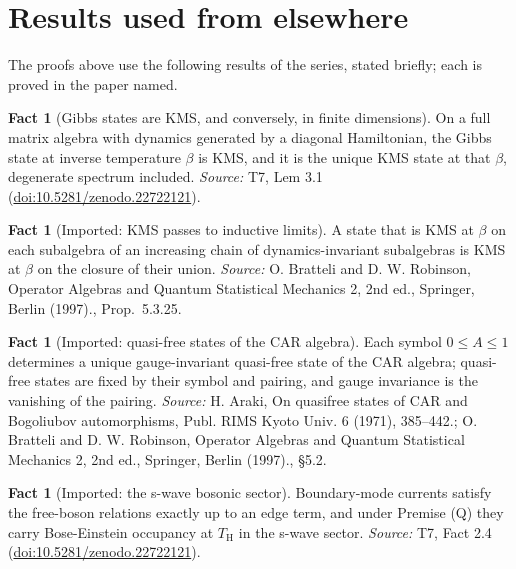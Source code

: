 \documentclass[11pt]{article}
\theoremstyle{definition}
\newtheorem{fact}[theorem]{Fact}
\theoremstyle{plain}
\providecommand{\TH}{}\renewcommand{\TH}{T_{\mathrm{H}}}
\begin{document}
\section{Results used from elsewhere}
The proofs above use the following results of the series, stated briefly; each is proved in the paper named.

\begin{fact}[Gibbs states are KMS, and conversely, in finite dimensions]\label{c:hawking.gibbs-states-are-kms-conversely-finite}
On a full matrix algebra with dynamics generated by a diagonal Hamiltonian, the Gibbs state at inverse temperature $\beta$ is KMS, and it is the unique KMS state at that $\beta$, degenerate spectrum included.
\emph{Source:} T7, Lem 3.1 (\href{https://doi.org/10.5281/zenodo.22722121}{doi:10.5281/zenodo.22722121}).
\end{fact}

\begin{fact}[Imported: KMS passes to inductive limits]\label{c:hawking.imported-kms-passes-inductive-limits}
A state that is KMS at $\beta$ on each subalgebra of an increasing chain of dynamics-invariant subalgebras is KMS at $\beta$ on the closure of their union.
\emph{Source:} O. Bratteli and D. W. Robinson, Operator Algebras and Quantum Statistical Mechanics 2, 2nd ed., Springer, Berlin (1997)., Prop.~5.3.25.
\end{fact}

\begin{fact}[Imported: quasi-free states of the CAR algebra]\label{c:hawking.imported-quasi-free-states-car-algebra}
Each symbol $0 \le A \le 1$ determines a unique gauge-invariant quasi-free state of the CAR algebra; quasi-free states are fixed by their symbol and pairing, and gauge invariance is the vanishing of the pairing.
\emph{Source:} H. Araki, On quasifree states of CAR and Bogoliubov automorphisms, Publ. RIMS Kyoto Univ. 6 (1971), 385--442.; O. Bratteli and D. W. Robinson, Operator Algebras and Quantum Statistical Mechanics 2, 2nd ed., Springer, Berlin (1997)., \S 5.2.
\end{fact}

\begin{fact}[Imported: the s-wave bosonic sector]\label{c:hawking.imported-s-wave-bosonic-sector}
Boundary-mode currents satisfy the free-boson relations exactly up to an edge term, and under Premise (Q) they carry Bose-Einstein occupancy at $\TH$ in the s-wave sector.
\emph{Source:} T7, Fact 2.4 (\href{https://doi.org/10.5281/zenodo.22722121}{doi:10.5281/zenodo.22722121}).
\end{fact}
\end{document}
